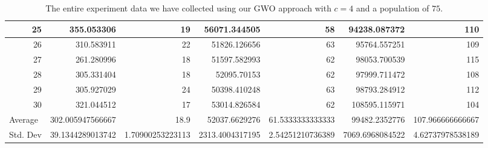 \begin{table}
\begin{adjustwidth}{}{}
{{\begin{tabular}{|r|r|r|r|r|r|r|}
					\hline
					25                                         & 355.053306                   & 19                                    & 56071.344505                   & 58                                    & 94238.087372                 & 110                                    \\ 
					\hline
					26                                         & 310.583911                   & 22                                    & 51826.126656                   & 63                                    & 95764.557251                 & 109                                    \\ 
					\hline
					27                                         & 261.280996                   & 18                                    & 51597.582993                   & 62                                    & 98053.700539                 & 115                                    \\ 
					\hline
					28                                         & 305.331404                   & 18                                    & 52095.70153                    & 62                                    & 97999.711472                 & 108                                    \\ 
					\hline
					29                                         & 305.927029                   & 24                                    & 50398.410248                   & 63                                    & 98793.284912                 & 112                                    \\ 
					\hline
					30                                         & 321.044512                   & 17                                    & 53014.826584                   & 62                                    & 108595.115971                & 104                                    \\ 
					\hline
					\multicolumn{1}{|l|}{Average}              & 302.005947566667             & 18.9                                  & 52037.6629276                  & 61.5333333333333                      & 99482.2352776                & 107.966666666667                       \\ 
					\hline
					\multicolumn{1}{|l|}{Std. Dev}             & 39.1344289013742             & 1.70900253223113                      & 2313.4004317195                & 2.54251210736389                      & 7069.6968084522              & 4.62737978538189                       \\
					\hline
		\end{tabular}}}
	\end{adjustwidth}
	\caption{The entire experiment data we have collected using our GWO approach with $c = 4$ and a population of $75$.}
	\label{full-data-gwo-c4-p75}
\end{table}

